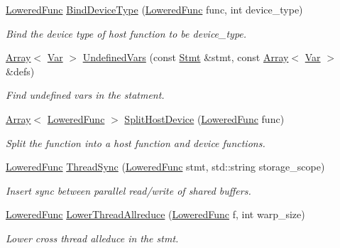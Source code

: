 \begin{DoxyCompactItemize}
\hyperlink{classtvm_1_1tir_1_1LoweredFunc}{Lowered\+Func} \hyperlink{namespacetvm_1_1tir_a1ac3af6813bf02262470992a3980a25a}{Bind\+Device\+Type} (\hyperlink{classtvm_1_1tir_1_1LoweredFunc}{Lowered\+Func} func, int device\+\_\+type)
\begin{DoxyCompactList}\small\item\em Bind the device type of host function to be device\+\_\+type. \end{DoxyCompactList}\item 
\hyperlink{classtvm_1_1Array}{Array}$<$ \hyperlink{classtvm_1_1tir_1_1Var}{Var} $>$ \hyperlink{namespacetvm_1_1tir_ae110e02855d8bc12eb8b6f92ed391844}{Undefined\+Vars} (const \hyperlink{classtvm_1_1tir_1_1Stmt}{Stmt} \&stmt, const \hyperlink{classtvm_1_1Array}{Array}$<$ \hyperlink{classtvm_1_1tir_1_1Var}{Var} $>$ \&defs)
\begin{DoxyCompactList}\small\item\em Find undefined vars in the statment. \end{DoxyCompactList}\item 
\hyperlink{classtvm_1_1Array}{Array}$<$ \hyperlink{classtvm_1_1tir_1_1LoweredFunc}{Lowered\+Func} $>$ \hyperlink{namespacetvm_1_1tir_ac7f5e04aea66d87ad42baf957768c451}{Split\+Host\+Device} (\hyperlink{classtvm_1_1tir_1_1LoweredFunc}{Lowered\+Func} func)
\begin{DoxyCompactList}\small\item\em Split the function into a host function and device functions. \end{DoxyCompactList}\item 
\hyperlink{classtvm_1_1tir_1_1LoweredFunc}{Lowered\+Func} \hyperlink{namespacetvm_1_1tir_ab0df6d882d69f4ec8e1b146a0d8728f9}{Thread\+Sync} (\hyperlink{classtvm_1_1tir_1_1LoweredFunc}{Lowered\+Func} stmt, std\+::string storage\+\_\+scope)
\begin{DoxyCompactList}\small\item\em Insert sync between parallel read/write of shared buffers. \end{DoxyCompactList}\item 
\hyperlink{classtvm_1_1tir_1_1LoweredFunc}{Lowered\+Func} \hyperlink{namespacetvm_1_1tir_a438729b72b0e38a28289d763b48995b1}{Lower\+Thread\+Allreduce} (\hyperlink{classtvm_1_1tir_1_1LoweredFunc}{Lowered\+Func} f, int warp\+\_\+size)
\begin{DoxyCompactList}\small\item\em Lower cross thread alleduce in the stmt. \end{DoxyCompactList}\item 

\end{DoxyCompactItemize}
